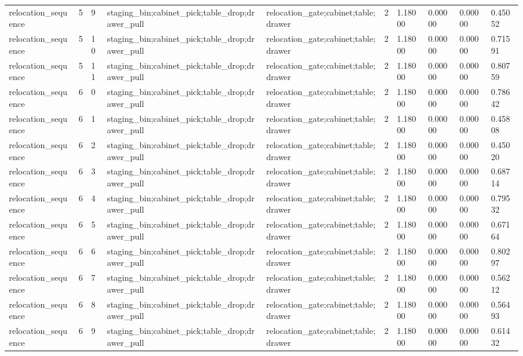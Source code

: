 \documentclass{article}
\begin{document}
\begin{table}[tbp]
{\begin{tabular}{llllllllll}
relocation\_sequence & 5 & 9 & staging\_bin;cabinet\_pick;table\_drop;drawer\_pull & relocation\_gate;cabinet;table;drawer & 2 & 1.18000 & 0.00000 & 0.00000 & 0.45052 \\
relocation\_sequence & 5 & 10 & staging\_bin;cabinet\_pick;table\_drop;drawer\_pull & relocation\_gate;cabinet;table;drawer & 2 & 1.18000 & 0.00000 & 0.00000 & 0.71591 \\
relocation\_sequence & 5 & 11 & staging\_bin;cabinet\_pick;table\_drop;drawer\_pull & relocation\_gate;cabinet;table;drawer & 2 & 1.18000 & 0.00000 & 0.00000 & 0.80759 \\
relocation\_sequence & 6 & 0 & staging\_bin;cabinet\_pick;table\_drop;drawer\_pull & relocation\_gate;cabinet;table;drawer & 2 & 1.18000 & 0.00000 & 0.00000 & 0.78642 \\
relocation\_sequence & 6 & 1 & staging\_bin;cabinet\_pick;table\_drop;drawer\_pull & relocation\_gate;cabinet;table;drawer & 2 & 1.18000 & 0.00000 & 0.00000 & 0.45808 \\
relocation\_sequence & 6 & 2 & staging\_bin;cabinet\_pick;table\_drop;drawer\_pull & relocation\_gate;cabinet;table;drawer & 2 & 1.18000 & 0.00000 & 0.00000 & 0.45020 \\
relocation\_sequence & 6 & 3 & staging\_bin;cabinet\_pick;table\_drop;drawer\_pull & relocation\_gate;cabinet;table;drawer & 2 & 1.18000 & 0.00000 & 0.00000 & 0.68714 \\
relocation\_sequence & 6 & 4 & staging\_bin;cabinet\_pick;table\_drop;drawer\_pull & relocation\_gate;cabinet;table;drawer & 2 & 1.18000 & 0.00000 & 0.00000 & 0.79532 \\
relocation\_sequence & 6 & 5 & staging\_bin;cabinet\_pick;table\_drop;drawer\_pull & relocation\_gate;cabinet;table;drawer & 2 & 1.18000 & 0.00000 & 0.00000 & 0.67164 \\
relocation\_sequence & 6 & 6 & staging\_bin;cabinet\_pick;table\_drop;drawer\_pull & relocation\_gate;cabinet;table;drawer & 2 & 1.18000 & 0.00000 & 0.00000 & 0.80297 \\
relocation\_sequence & 6 & 7 & staging\_bin;cabinet\_pick;table\_drop;drawer\_pull & relocation\_gate;cabinet;table;drawer & 2 & 1.18000 & 0.00000 & 0.00000 & 0.56212 \\
relocation\_sequence & 6 & 8 & staging\_bin;cabinet\_pick;table\_drop;drawer\_pull & relocation\_gate;cabinet;table;drawer & 2 & 1.18000 & 0.00000 & 0.00000 & 0.56493 \\
relocation\_sequence & 6 & 9 & staging\_bin;cabinet\_pick;table\_drop;drawer\_pull & relocation\_gate;cabinet;table;drawer & 2 & 1.18000 & 0.00000 & 0.00000 & 0.61432 \\

\end{tabular}}
\end{table}
\end{document}
